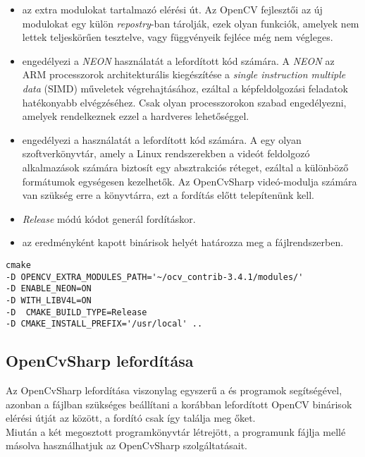 \begin{itemize}
\item {} az extra modulokat tartalmazó elérési út. Az OpenCV fejlesztői az új modulokat egy külön \textit{repostry}-ban tárolják, ezek olyan funkciók, amelyek nem lettek teljeskörűen tesztelve, vagy függvényeik fejléce még nem végleges.
\item {} engedélyezi a \emph{NEON} használatát a lefordított kód számára. A \emph{NEON} az ARM processzorok architekturális kiegészítése a \textit{single instruction multiple data} (SIMD) műveletek végrehajtásához, ezáltal a képfeldolgozási feladatok hatékonyabb elvégzéséhez. Csak olyan processzorokon szabad engedélyezni, amelyek rendelkeznek ezzel a hardveres lehetőséggel.
\item {} engedélyezi a  használatát a lefordított kód számára. A  egy olyan szoftverkönyvtár, amely a Linux rendszerekben a videót feldolgozó alkalmazások számára biztosít egy absztrakciós réteget, ezáltal a különböző formátumok egységesen kezelhetők. Az OpenCvSharp videó-modulja számára van szükség erre a könyvtárra, ezt a fordítás előtt telepítenünk kell.
\item {} \textit{Release} módú kódot generál fordításkor.
\item {} az eredményként kapott binárisok helyét határozza meg a fájlrendszerben.
\end{itemize}

\begin{mdframed}[backgroundcolor=gray!20]
\begin{small}
\begin{lstlisting}
cmake
-D OPENCV_EXTRA_MODULES_PATH='~/ocv_contrib-3.4.1/modules/'
-D ENABLE_NEON=ON
-D WITH_LIBV4L=ON 
-D  CMAKE_BUILD_TYPE=Release
-D CMAKE_INSTALL_PREFIX='/usr/local' ..
\end{lstlisting}
\end{small}
\end{mdframed}

\subsection{OpenCvSharp lefordítása}

Az OpenCvSharp lefordítása viszonylag egyszerű a  és  programok segítségével, azonban a  fájlban szükséges beállítani a korábban lefordított OpenCV binárisok elérési útját az  között, a fordító csak így találja meg őket.\\
Miután a két megosztott programkönyvtár létrejött, a programunk  fájlja mellé másolva használhatjuk az OpenCvSharp szolgáltatásait.

